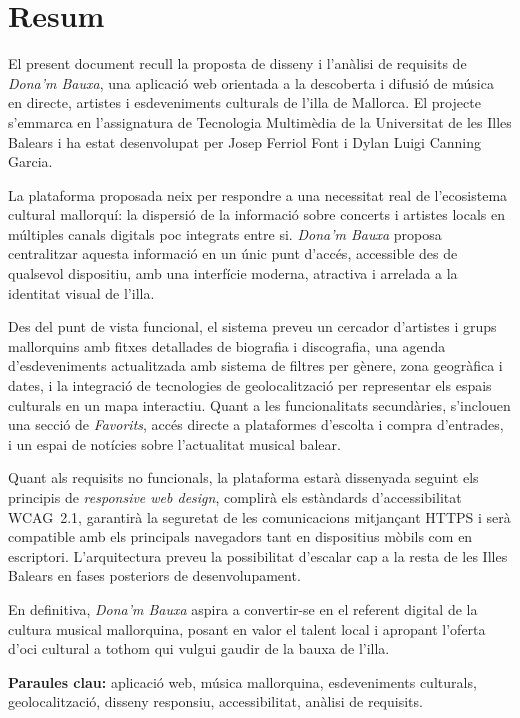 \chapter*{Resum}

El present document recull la proposta de disseny i l'anàlisi de requisits de \textit{Dona'm Bauxa}, una aplicació web orientada a la descoberta i difusió de música en directe, artistes i esdeveniments culturals de l'illa de Mallorca. El projecte s'emmarca en l'assignatura de Tecnologia Multimèdia de la Universitat de les Illes Balears i ha estat desenvolupat per Josep Ferriol Font i Dylan Luigi Canning Garcia.

La plataforma proposada neix per respondre a una necessitat real de l'ecosistema cultural mallorquí: la dispersió de la informació sobre concerts i artistes locals en múltiples canals digitals poc integrats entre si. \textit{Dona'm Bauxa} proposa centralitzar aquesta informació en un únic punt d'accés, accessible des de qualsevol dispositiu, amb una interfície moderna, atractiva i arrelada a la identitat visual de l'illa.

Des del punt de vista funcional, el sistema preveu un cercador d'artistes i grups mallorquins amb fitxes detallades de biografia i discografia, una agenda d'esdeveniments actualitzada amb sistema de filtres per gènere, zona geogràfica i dates, i la integració de tecnologies de geolocalització per representar els espais culturals en un mapa interactiu. Quant a les funcionalitats secundàries, s'inclouen una secció de \textit{Favorits}, accés directe a plataformes d'escolta i compra d'entrades, i un espai de notícies sobre l'actualitat musical balear.

Quant als requisits no funcionals, la plataforma estarà dissenyada seguint els principis de \textit{responsive web design}, complirà els estàndards d'accessibilitat WCAG~2.1, garantirà la seguretat de les comunicacions mitjançant HTTPS i serà compatible amb els principals navegadors tant en dispositius mòbils com en escriptori. L'arquitectura preveu la possibilitat d'escalar cap a la resta de les Illes Balears en fases posteriors de desenvolupament.

En definitiva, \textit{Dona'm Bauxa} aspira a convertir-se en el referent digital de la cultura musical mallorquina, posant en valor el talent local i apropant l'oferta d'oci cultural a tothom qui vulgui gaudir de la bauxa de l'illa.

\bigskip

\noindent\textbf{Paraules clau:} aplicació web, música mallorquina, esdeveniments culturals, geolocalització, disseny responsiu, accessibilitat, anàlisi de requisits.
